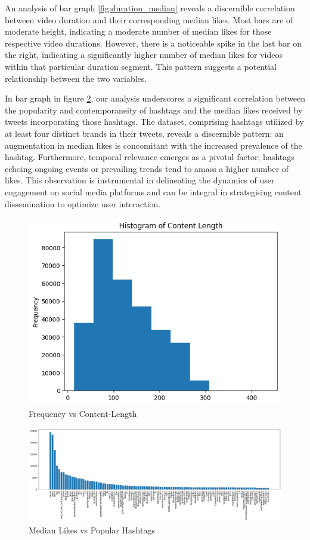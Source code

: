\documentclass[11pt,a4paper]{article}
\begin{document}
An analysis of bar graph \ref{fig:duration_median} reveals a discernible correlation between video duration and their corresponding median likes. Most bars are of moderate height, indicating a moderate number of median likes for those respective video durations. However, there is a noticeable spike in the last bar on the right, indicating a significantly higher number of median likes for videos within that particular duration segment. This pattern suggests a potential relationship between the two variables.

In bar graph in figure \ref{fig:median-likes-vs-hashtags}, our analysis underscores a significant correlation between the popularity and contemporaneity of hashtags and the median likes received by tweets incorporating those hashtags. The dataset, comprising hashtags utilized by at least four distinct brands in their tweets, reveals a discernible pattern: an augmentation in median likes is concomitant with the increased prevalence of the hashtag. Furthermore, temporal relevance emerges as a pivotal factor; hashtags echoing ongoing events or prevailing trends tend to amass a higher number of likes. This observation is instrumental in delineating the dynamics of user engagement on social media platforms and can be integral in strategising content dissemination to optimize user interaction.

\begin{figure}
    \centering
    \includegraphics[width=0.5\linewidth]{content_len_histogram.png}
    \caption{Frequency vs Content-Length}
    \label{fig:enter-label}
\end{figure}

\begin{figure}
    \centering
    \includegraphics[width=1.0\linewidth]{median_likes_vs_hashtags.png}
    \caption{Median Likes vs Popular Hashtags}
    \label{fig:median-likes-vs-hashtags}
\end{figure}
\end{document}
